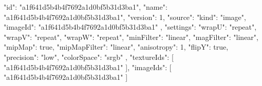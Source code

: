 {
  "id": "a1f641d5b4b4f7692a1d0bf5b31d3ba1",
  "name": "a1f641d5b4b4f7692a1d0bf5b31d3ba1",
  "version": 1,
  "source": {
    "kind": "image",
    "imageId": "a1f641d5b4b4f7692a1d0bf5b31d3ba1"
  },
  "settings": {
    "wrapU": "repeat",
    "wrapV": "repeat",
    "wrapW": "repeat",
    "minFilter": "linear",
    "magFilter": "linear",
    "mipMap": true,
    "mipMapFilter": "linear",
    "anisotropy": 1,
    "flipY": true,
    "precision": "low",
    "colorSpace": "srgb"
  },
  "textureIds": [
    "a1f641d5b4b4f7692a1d0bf5b31d3ba1"
  ],
  "imageIds": [
    "a1f641d5b4b4f7692a1d0bf5b31d3ba1"
  ]
}
